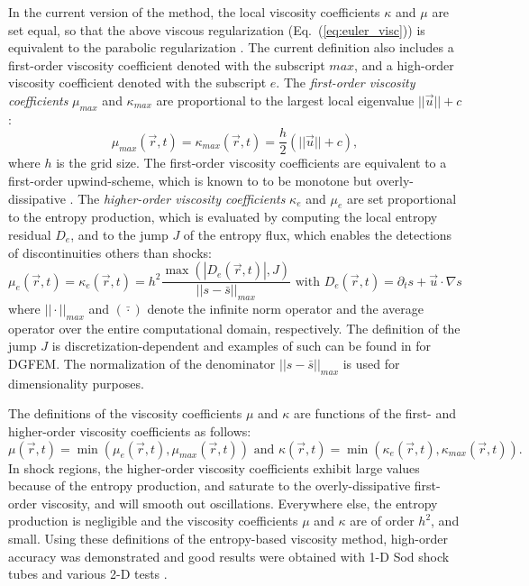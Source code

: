 \documentclass[12pt]{article}
\newcommand{\eqt}[1]{Eq.~(\ref{#1})} %
\begin{document}
In the current version of the method, the local viscosity coefficients $\kappa$ and $\mu$ are set equal, so that the above viscous regularization (\eqt{eq:euler_visc}) is equivalent to the parabolic regularization \cite{Parabolic}. The current definition also includes a first-order viscosity coefficient denoted with the subscript $max$, and a high-order viscosity coefficient denoted with the subscript $e$. The \emph{first-order viscosity coefficients} $\mu_{max}$ and $\kappa_{max}$ are proportional to the largest local eigenvalue $|| \vec{u} || + c $ : 
\begin{equation}
\label{eq:equation15}
\mu_{max}(\vec{r}, t) = \kappa_{max}(\vec{r}, t) = \frac{h}{2} \left( || \vec{u} || + c \right),
\end{equation}
where $h$ is the grid size.  The first-order viscosity coefficients are equivalent to a first-order upwind-scheme, which is known to to be monotone but overly-dissipative \cite{Toro}.
The \emph{higher-order viscosity coefficients} $\kappa_e$ and $\mu_e$ are set proportional to the entropy production, which is evaluated by computing the local entropy residual $D_e$, and to the jump $J$ of the entropy flux, which enables the detections of discontinuities others than shocks:
\begin{equation}
\label{eq:ent_visc_coeff}
\mu_e(\vec{r},t) = \kappa_e(\vec{r},t) = h^2 \frac{\max\left( | D_e(\vec{r},t) |, J \right)}{|| s - \bar{s} ||_{max}} \text{ with } D_e(\vec{r}, t) = \partial_t s + \vec{u} \cdot \nabla s
\end{equation}
where $|| \cdot ||_{max}$ and $(\bar{\cdot})$ denote the infinite norm operator and the average operator over the entire computational domain, respectively. The definition of the jump $J$ is discretization-dependent and examples of such can be found in \cite{valentin} for DGFEM. The normalization of the denominator $|| s - \bar{s} ||_{max}$ is used for dimensionality purposes.

The definitions of the viscosity coefficients $\mu$ and $\kappa$ are functions of the first- and higher-order viscosity coefficients as follows:
\begin{equation}
\label{eq:mu}
\mu(\vec{r},t) = \min\left( \mu_e(\vec{r},t), \mu_{max}(\vec{r},t) \right) \text{ and } \kappa(\vec{r},t) = \min\left( \kappa_e(\vec{r},t), \kappa_{max}(\vec{r},t) \right).
\end{equation}
In shock regions, the higher-order viscosity coefficients exhibit large values because of the entropy production, and saturate to the overly-dissipative first-order viscosity, and will smooth out oscillations. Everywhere else, the entropy production is negligible and the viscosity coefficients $\mu$ and $\kappa$ are of order $h^2$, and small.
Using these definitions of the entropy-based viscosity method, high-order accuracy was demonstrated and good results were obtained with 1-D Sod shock tubes and various 2-D tests \cite{valentin, jlg1, jlg2}.
\end{document}
